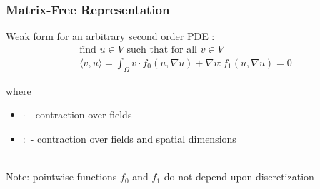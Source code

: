 \documentclass{beamer}
\begin{document}
\begin{frame}
\begin{center}
\frametitle{Matrix-Free Representation}

Weak form for an arbitrary second order PDE \cite{brown2010efficient}:\\

\begin{equation}
\begin{array}{c}
\text{find } u \in V \text{ such that for all } v \in V\\
\langle v, u \rangle = \int_{\Omega} v \cdot f_0 \left( u, \nabla u \right) + \nabla v : f_1 \left( u, \nabla u \right) = 0
\end{array}
\label{eq:weak_form}
\end{equation}

\begin{flushleft}
where
\end{flushleft}

\begin{itemize}

\item $\cdot$ - contraction over fields\\

\item $:$ - contraction over fields and spatial dimensions\\

\end{itemize}

~\\

Note: pointwise functions $f_0$ and $f_1$ do not depend upon discretization\\

\end{center}
\end{frame}

\end{document}

